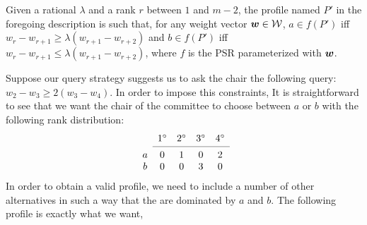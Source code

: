 \begin{claim}
	Given a rational $\lambda$ and a rank $r$ between $1$ and $m - 2$, the profile named $P'$ in the foregoing description is such that, for any weight vector $\bm{w} \in \mathcal{W}$, $a \in f(P')$ iff $w_{r} - w_{r+1} ≥ \lambda (w_{r+1} - w_{r+2})$ and $b \in f(P')$ iff $w_{r} - w_{r+1} ≤ \lambda (w_{r+1} - w_{r+2})$, where $f$ is the PSR parameterized with $\bm{w}$.
\end{claim}

\begin{example}
Suppose our query strategy suggests us to ask the chair the following query: $w_{2} - w_{3} \geq 2(w_{3} - w_{4})$.
In order to impose this constraints,
It is straightforward to see that we want the  chair of the committee to choose between $a$ or $b$ with the following rank distribution:
\[
\begin{array}{ccccc}
& 1^\circ
& 2^\circ
& 3^\circ
& 4^\circ \\
\cmidrule{2-5}
a & 0& 1& 0& 2 \\
b& 0& 0& 3& 0 \\
\end{array}
\]
In order to obtain a valid profile, we need to include a number of other alternatives in such a way that the are dominated by $a$ and $b$.
The following profile is exactly what we want,


\end{example}
